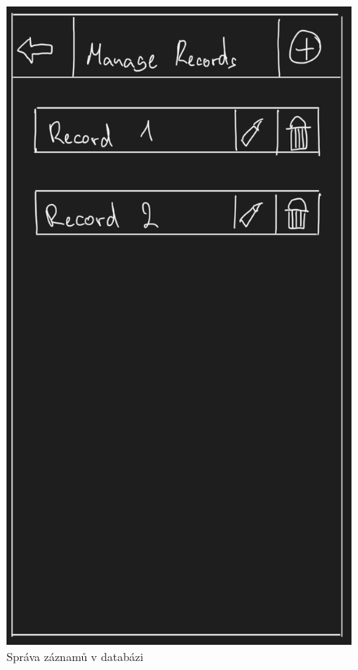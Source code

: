 \documentclass[12pt, titlepage]{article}
\begin{document}
\begin{figure}[ht]
	\centering
	\includegraphics[scale=0.43]{manage_records}
	\caption{Správa záznamů v databázi}
	\label{fig:manage_records}
\end{figure}
\end{document}
